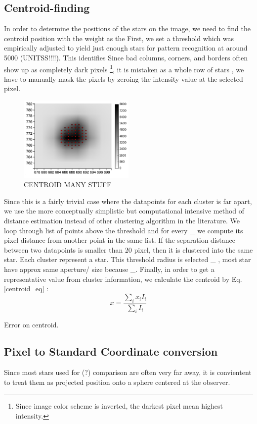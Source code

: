 \documentclass[authoryear, 12pt,5p, times]{elsarticle}
\begin{document}
\subsection{Centroid-finding}
\label{centroid_find}
In order to determine the positions of the stars on the image, we need to find the centroid position with the weight as the 
First, we set a threshold which was empirically adjusted to yield just enough stars for pattern recognition at around 5000 (UNITSS!!!!). This identifies 
Since bad columns, corners, and borders often show up as completely dark pixels \footnote{Since image color scheme is inverted, the darkest pixel mean highest intensity.}, it is mistaken as a whole row of stars , we have to manually mask the pixels by zeroing the intensity value at the selected pixel.
	\begin{figure}[h!]
\includegraphics[width=0.5\textwidth]{figures/centroid_many}
\caption{CENTROID MANY STUFF}
\label{centroid_many}
\end{figure}
Since this is a fairly trivial case where the datapoints for each cluster is far apart, we use the more conceptually simplistic but computational intensive method of distance estimation instead of other clustering algorithm  in the literature.  We loop through list of points above the threshold and for every \_ we compute its pixel distance from another point in the same list. If the separation distance between two datapoints is smaller than 20 pixel, then it is clustered into the same star. Each cluster represent a star. This threshold radius is selected  \_ , most star have approx same aperture/ size because \_. Finally, in order to get a representative value from cluster information, we calculate the centroid by Eq. \ref{centroid_eq} :
\begin{equation}
x = \frac{\sum \limits_{i} x_i I_i}{\sum\limits_{i} I_i}
\label{centroid_eq}
\end{equation}

Error on centroid. 
\subsection{Pixel to Standard Coordinate conversion}
Since most stars used for (?) comparison are often very far away, it is convientent to treat them as projected position onto a sphere centered at the observer.
\end{document}
